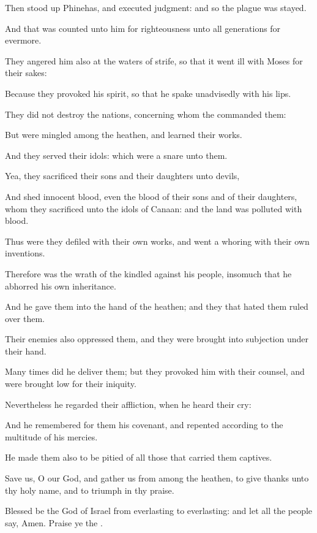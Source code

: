 \verse Then stood up Phinehas, and executed judgment: and so the plague was stayed.

\verse And that was counted unto him for righteousness unto all generations for evermore.

\verse They angered him also at the waters of strife, so that it went ill with Moses for their sakes:

\verse Because they provoked his spirit, so that he spake unadvisedly with his lips.

\verse They did not destroy the nations, concerning whom the \LORD commanded them:

\verse But were mingled among the heathen, and learned their works.

\verse And they served their idols: which were a snare unto them.

\verse Yea, they sacrificed their sons and their daughters unto devils,

\verse And shed innocent blood, even the blood of their sons and of their daughters, whom they sacrificed unto the idols of Canaan: and the land was polluted with blood.

\verse Thus were they defiled with their own works, and went a whoring with their own inventions.

\verse Therefore was the wrath of the \LORD kindled against his people, insomuch that he abhorred his own inheritance.

\verse And he gave them into the hand of the heathen; and they that hated them ruled over them.

\verse Their enemies also oppressed them, and they were brought into subjection under their hand.

\verse Many times did he deliver them; but they provoked him with their counsel, and were brought low for their iniquity.

\verse Nevertheless he regarded their affliction, when he heard their cry:

\verse And he remembered for them his covenant, and repented according to the multitude of his mercies.

\verse He made them also to be pitied of all those that carried them captives.

\verse Save us, O \LORD our God, and gather us from among the heathen, to give thanks unto thy holy name, and to triumph in thy praise.

\verse Blessed be the \LORD God of Israel from everlasting to everlasting: and let all the people say, Amen. Praise ye the \LORD.




